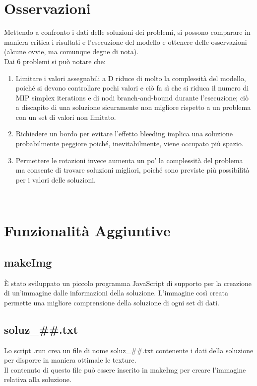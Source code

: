 
	\section{Osservazioni}
	
Mettendo a confronto i dati delle soluzioni dei problemi, si possono comparare in maniera critica i risultati e l'esecuzione del modello e ottenere delle osservazioni (alcune ovvie, ma comunque degne di nota).\\
Dai 6 problemi si può notare che:
\begin{enumerate}
	\item Limitare i valori assegnabili a D riduce di molto la complessità del modello, poiché si devono controllare pochi valori e ciò fa sì che si riduca il numero di MIP simplex iterations e di nodi branch-and-bound durante l'esecuzione; ciò a discapito di una soluzione sicuramente non migliore rispetto a un problema con un set di valori non limitato.
	\item Richiedere un bordo per evitare l'effetto bleeding implica una soluzione probabilmente peggiore poiché, inevitabilmente, viene occupato più spazio.
	\item Permettere le rotazioni invece aumenta un po' la complessità del problema ma consente di trovare soluzioni migliori, poiché sono previste più possibilità per i valori delle soluzioni.
\end{enumerate}
\ \\





\section{Funzionalità Aggiuntive}

\subsection{makeImg}
È stato sviluppato un piccolo programma JavaScript di supporto per la creazione di un'immagine dalle informazioni della soluzione. L'immagine così creata permette una migliore comprensione della soluzione di ogni set di dati. 

\subsection{soluz\_\#\#.txt}
Lo script .run crea un file di nome soluz\_\#\#.txt contenente i dati della soluzione per disporre in maniera ottimale le texture. \\
Il contenuto di questo file può essere inserito in makeImg per creare l'immagine relativa alla soluzione.

\newpage
